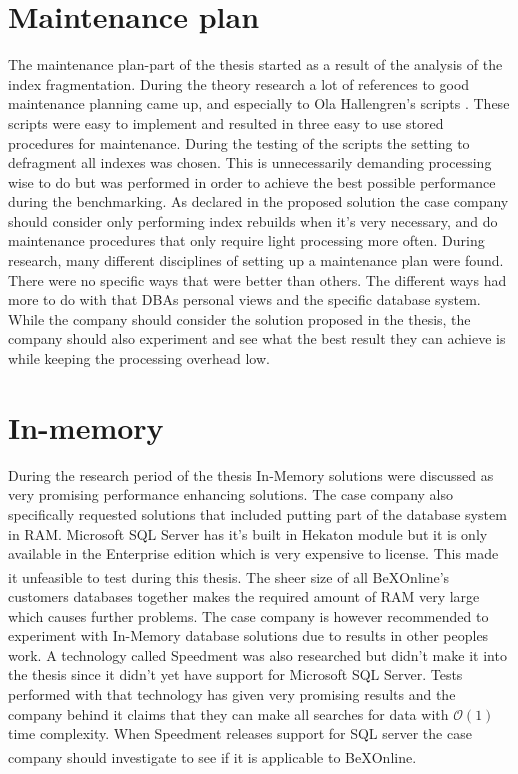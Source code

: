\documentclass{cslthse-msc}
\newcommand{\bex}{BeX\textsuperscript{\textregistered}}
\begin{document}
\section{Maintenance plan}
The maintenance plan-part of the thesis started as a result of the analysis of the index fragmentation. During the theory research a lot of references to good maintenance planning came up, and especially to Ola Hallengren's scripts \cite{Hallengren15}. These scripts were easy to implement and resulted in three easy to use stored procedures for maintenance. During the testing of the scripts the setting to defragment all indexes was chosen. This is unnecessarily demanding processing wise to do but was performed in order to achieve the best possible performance during the benchmarking. As declared in the proposed solution the case company should consider only performing index rebuilds when it's very necessary, and do maintenance procedures that only require light processing more often. During research, many different disciplines of setting up a maintenance plan were found. There were no specific ways that were better than others. The different ways had more to do with that DBAs personal views and the specific database system. While the company should consider the solution proposed in the thesis, the company should also experiment and see what the best result they can achieve is while keeping the processing overhead low. 

\section{In-memory}
During the research period of the thesis In-Memory solutions were discussed as very promising performance enhancing solutions. The case company also specifically requested solutions that included putting part of the database system in RAM. Microsoft SQL Server has it's built in Hekaton module but it is only available in the Enterprise edition which is very expensive to license. This made it unfeasible to test during this thesis. The sheer size of all \bex Online's customers databases together makes the required amount of RAM very large which causes further problems. The case company is however recommended to experiment with In-Memory database solutions due to results in other peoples work. A technology called Speedment \cite{speedment} was also researched but didn't make it into the thesis since it didn't yet have support for Microsoft SQL Server. Tests performed with that technology has given very promising results and the company behind it claims that they can make all searches for data with $\mathcal{O}(1)$ time complexity. When Speedment releases support for SQL server the case company should investigate to see if it is applicable to \bex Online.
\end{document}
